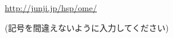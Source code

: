 \documentclass[a4paper,dvipdfmx]{jarticle}
\begin{document}
\bigskip


\bigskip

\url{http://junji.jp/hsp/ome/}

(記号を間違えないように入力してください)


\bigskip


\bigskip


\bigskip


\bigskip


\bigskip


\bigskip


\bigskip


\bigskip


\bigskip


\bigskip


\bigskip


\bigskip


\bigskip


\bigskip


\bigskip


\bigskip
\end{document}
